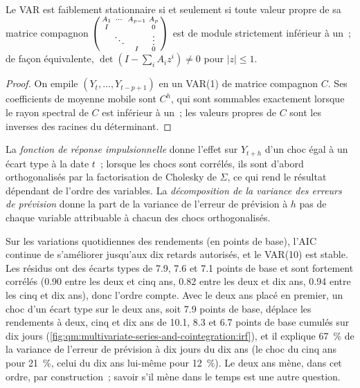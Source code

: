 \begin{proposition}\label{prop:qm:multivariate-series-and-cointegration:stable}
Le VAR est faiblement stationnaire si et seulement si toute valeur propre de sa matrice compagnon $\begin{psmallmatrix}A_1 & \cdots & A_{p-1} & A_p\\ I & & & 0\\ & \ddots & & \vdots\\
& & I & 0\end{psmallmatrix}$ est de module strictement inférieur à un~; de façon équivalente, $\det(I - \sum_iA_iz^i) \ne 0$ pour $|z| \le 1$.
\end{proposition}

\begin{proof}
On empile $(Y_t, \dots, Y_{t-p+1})$ en un VAR(1) de matrice compagnon $C$. Ses coefficients de moyenne mobile sont $C^h$, qui sont sommables exactement lorsque le
rayon spectral de $C$ est inférieur à un~; les valeurs propres de $C$ sont les inverses des racines du déterminant.
\end{proof}

\begin{definition}\label{def:qm:multivariate-series-and-cointegration:irf}
La \emph{fonction de réponse impulsionnelle} donne l'effet sur $Y_{t+h}$ d'un choc égal à un écart type à la date $t$~; lorsque les chocs sont corrélés,
ils sont d'abord orthogonalisés par la factorisation de Cholesky de $\Sigma$, ce qui rend le résultat dépendant de l'ordre des variables. La
\emph{décomposition de la variance des erreurs de prévision} donne la part de la variance de l'erreur de prévision à $h$ pas de chaque variable
attribuable à chacun des chocs orthogonalisés.
\end{definition}

Sur les variations quotidiennes des rendements (en points de base), l'AIC continue de s'améliorer jusqu'aux dix retards autorisés, et le VAR(10) est stable. Les résidus ont des
écarts types de 7.9, 7.6 et 7.1 points de base et sont fortement corrélés (0.90 entre les deux et cinq ans, 0.82 entre les deux et dix ans, 0.94 entre
les cinq et dix ans), donc l'ordre compte. Avec le deux ans placé en premier, un choc d'un écart type sur le deux ans, soit 7.9 points de base, déplace les rendements à deux, cinq
et dix ans de 10.1, 8.3 et 6.7 points de base cumulés sur dix jours (\cref{fig:qm:multivariate-series-and-cointegration:irf}), et il explique
67~\% de la variance de l'erreur de prévision à dix jours du dix ans (le choc du cinq ans pour 21~\%, celui du dix ans lui-même pour 12~\%). Le deux ans mène, dans cet ordre,
par construction~; savoir s'il mène dans le temps est une autre question.

